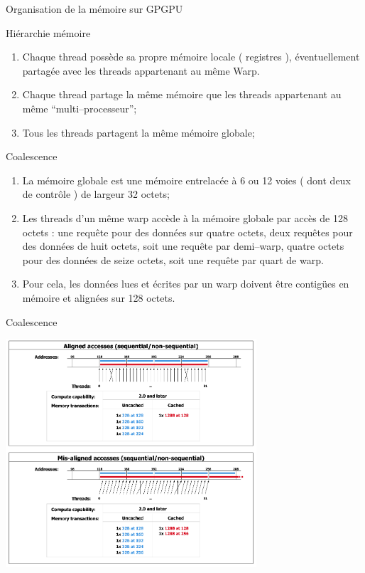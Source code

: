 \documentclass[handout,francais]{beamer}
\begin{document}
\begin{frame}[fragile]{Organisation de la mémoire sur GPGPU}
\scriptsize
 \begin{block}{Hiérarchie mémoire}
 \begin{enumerate}
  \item Chaque thread possède sa propre mémoire locale ( registres ), éventuellement
  partagée avec les threads appartenant au même Warp.
  \item Chaque thread partage la même mémoire que les threads appartenant au même 
  ``multi--processeur'';
  \item Tous les threads partagent la même mémoire globale;
 \end{enumerate}
 \end{block}

 \begin{block}{Coalescence}
  \begin{enumerate}
   \item La mémoire globale est une mémoire entrelacée à 6 ou 12 voies ( dont deux de contrôle )
   de largeur 32 octets;
   \item Les threads d'un même warp accède à la mémoire globale par accès de 128 octets : une requête pour
   des données sur quatre octets, deux requêtes
   pour des données de huit octets, soit une requête par demi--warp, quatre octets pour des données de seize octets,
   soit une requête par quart de warp. 
   \item Pour cela, les données lues et écrites par un warp doivent être contigües en mémoire et alignées sur
   128 octets.
  \end{enumerate}

 \end{block}
\end{frame}

\begin{frame}[fragile]{Coalescence}
\begin{center}
\includegraphics[width=0.7\textwidth]{Coalescence}
\end{center}
\end{frame}
\end{document}
